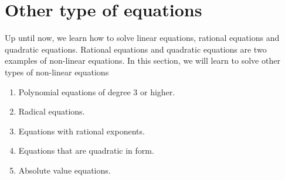 \chapter{Other type of equations}
Up until now, we learn how to solve linear equations, rational equations and quadratic equations. Rational equations and quadratic equations are two examples of non-linear equations. In this section, we will learn to solve other types of non-linear equations
\begin{enumerate}[label=\protect\circled{\arabic*}]
    \item Polynomial equations of degree 3 or higher.
    \item Radical equations.
    \item Equations with rational exponents.
    \item Equations that are quadratic in form.
    \item Absolute value equations.
\end{enumerate}
